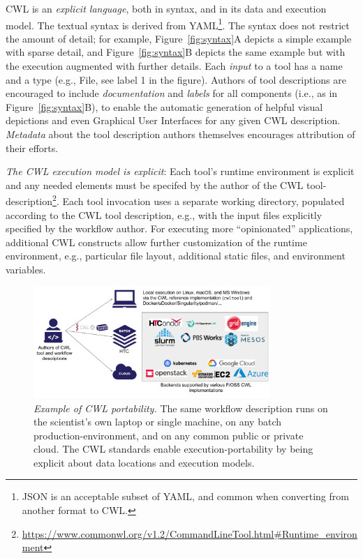 \documentclass[sigconf,revew,screen,timestamp,nonacm]{acmart}
\begin{document}
CWL is an \textit{explicit language}, both in syntax, and in its data and execution model. The textual syntax is derived from YAML\footnote{JSON is an acceptable subset of YAML, and common when converting from another format to CWL.}. The syntax does not restrict the amount of detail; for example, Figure~\ref{fig:syntax}A depicts a simple example with sparse detail, and Figure~\ref{fig:syntax}B depicts the same example but with the execution augmented with further details. Each \textit{input} to a tool has a name and a type (e.g., File, see label 1 in the figure). %
Authors of tool descriptions are encouraged to include \textit{documentation} and \textit{labels} for all components (i.e., as in Figure~\ref{fig:syntax}B), to enable the automatic generation of helpful visual depictions and even Graphical User Interfaces %
for any given CWL description. \textit{Metadata} about the tool description authors themselves encourages attribution of their efforts.

\textit{The CWL execution model is explicit}: Each tool's runtime environment is explicit and any needed elements must be specifed by the author of the CWL tool-description\footnote{\url{https://www.commonwl.org/v1.2/CommandLineTool.html\#Runtime_environment}}. Each tool invocation uses a separate working directory, populated according to the CWL tool description, e.g., with the input files explicitly specified by the workflow author. For executing more ``opinionated'' applications, additional CWL constructs allow further customization of the runtime environment, e.g., particular file layout, additional static files, and environment variables.

\begin{figure}
  \centering
  \includegraphics[width=0.8\textwidth]{figure2}
  \vspace*{-0.5cm}
  \caption{\emph{Example of CWL portability.} The same workflow description runs on the scientist's own laptop or single machine, on any batch production-environment, and on any common public or private cloud. The CWL standards enable execution-portability by being explicit about data locations and execution models.} 
  \label{fig:portability}
\end{figure}
\end{document}
